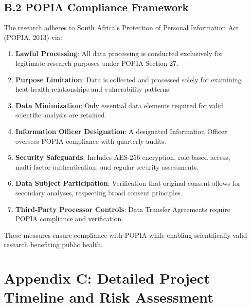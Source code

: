 \graphicspath{{./}{./sections/images/}{./images/}}\documentclass[12pt,a4paper,landscape]{article}
\begin{document}
\subsection*{B.2 POPIA Compliance Framework}

The research adheres to South Africa's Protection of Personal Information Act (POPIA, 2013) via:

\begin{enumerate}[leftmargin=*, itemsep=0.5em]
    \item \textbf{Lawful Processing}: All data processing is conducted exclusively for legitimate research purposes under POPIA Section 27.
    \item \textbf{Purpose Limitation}: Data is collected and processed solely for examining heat-health relationships and vulnerability patterns.
    \item \textbf{Data Minimization}: Only essential data elements required for valid scientific analysis are retained.
    \item \textbf{Information Officer Designation}: A designated Information Officer oversees POPIA compliance with quarterly audits.
    \item \textbf{Security Safeguards}: Includes AES-256 encryption, role-based access, multi-factor authentication, and regular security assessments.
    \item \textbf{Data Subject Participation}: Verification that original consent allows for secondary analyses, respecting broad consent principles.
    \item \textbf{Third-Party Processor Controls}: Data Transfer Agreements require POPIA compliance and verification.
\end{enumerate}

These measures ensure compliance with POPIA while enabling scientifically valid research benefiting public health.

\clearpage
\section*{Appendix C: Detailed Project Timeline and Risk Assessment}
\end{document}

